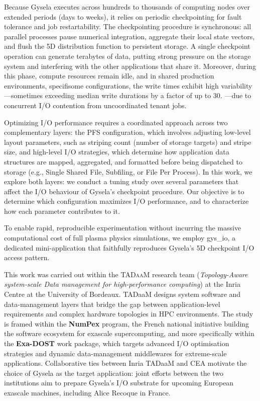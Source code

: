 Because Gysela executes across hundreds to thousands of computing nodes over extended periods (days to weeks), it relies on periodic checkpointing for fault 
tolerance and job restartability. The checkpointing procedure is synchronous: all parallel processes pause numerical integration, aggregate their local state 
vectors, and flush the 5D distribution function to persistent storage. A single checkpoint operation can generate terabytes of data, putting strong pressure on
the storage system and interfering with the other applications that share it. Moreover, during this phase, compute resources remain idle, and in shared production 
environments, specifisome configurations, the write times exhibit high variability—sometimes exceeding median write durations by a factor of up to 30\cite{trochon2025checkpointing}.
—due to concurrent I/O contention from uncoordinated tenant jobs.

Optimizing I/O performance requires a coordinated approach across two complementary layers: the PFS configuration, which involves adjusting low-level layout
parameters, such as striping count (number of storage targets) and stripe size, and high-level I/O strategies, which determine how application data structures 
are mapped, aggregated, and formatted before being dispatched to storage (e.g., Single Shared File, Subfiling, or File Per Process). In this work, we explore
both layers: we conduct a tuning study over several parameters that affect the I/O behaviour of Gysela's checkpoint procedure. Our objective is to determine 
which configuration maximizes I/O performance, and to characterize how each parameter contributes to it. 

To enable rapid, reproducible experimentation without incurring the massive computational cost of full plasma physics simulations, we employ gys\_io, a dedicated 
mini-application that faithfully reproduces Gysela's 5D checkpoint I/O access pattern\cite{gysela_miniapp_io}.

This work was carried out within the \textsc{TADaaM} research team (\textit{Topology-Aware system-scale Data management for high-performance computing}) at 
the Inria Centre at the University of Bordeaux. TADaaM designs system software and data-management layers that bridge the gap between application-level 
requirements and complex hardware topologies in HPC environments. The study is framed within the \textbf{NumPex} program, the French national initiative building 
the software ecosystem for exascale supercomputing, and more specifically within the \textbf{Exa-DOST} work package, which targets advanced I/O optimisation 
strategies and dynamic data-management middlewares for extreme-scale applications. Collaborative ties between Inria TADaaM and CEA motivate the choice of Gysela 
as the target application: joint efforts between the two institutions aim to prepare Gysela's I/O substrate for upcoming European exascale machines, including 
Alice Recoque in France.

